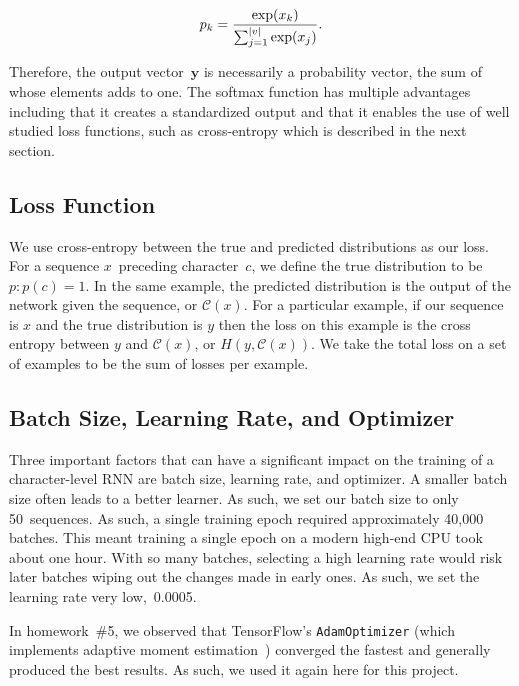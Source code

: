 \documentclass{article}
\DeclarePairedDelimiter\abs{\lvert}{\rvert}%
\begin{document}
\begin{equation}
  p_k = \frac{\exp(x_k)}{\sum_{j=1}^{\abs*{v}} \exp(x_j)}\textrm{.}
\end{equation}

Therefore, the output vector~$\mathbf{y}$ is necessarily a probability vector, the sum of whose elements adds to one. The softmax function has multiple advantages including that it creates a standardized output and that it enables the use of well studied loss functions, such as cross-entropy which is described in the next section.

\subsection{Loss Function}

We use cross-entropy between the true and predicted distributions as our loss. For a sequence $x$~preceding character~$c$, we define the true distribution to be $p: p(c) = 1$. In the same example, the predicted distribution is the output of the network given the sequence, or $\mathcal{C}(x)$. For a particular example, if our sequence is $x$ and the true distribution is $y$ then the loss on this example is the cross entropy between $y$ and $\mathcal{C}(x)$, or $H(y, \mathcal{C}(x))$. We take the total loss on a set of examples to be the sum of losses per example.

\subsection{Batch Size, Learning Rate, and Optimizer}

Three important factors that can have a significant impact on the training of a character-level RNN are batch size, learning rate, and optimizer.  A smaller batch size often leads to a better learner.  As such, we set our batch size to only 50~sequences.  As such, a single training epoch required approximately 40,000 batches. This meant training a single epoch on a modern high-end CPU took about one hour.  With so many batches, selecting a high learning rate would risk later batches wiping out the changes made in early ones.  As such, we set the learning rate very low,~0.0005. 

In homework~\#5, we observed that TensorFlow's \texttt{AdamOptimizer} (which implements adaptive moment estimation~\cite{kingma2014}) converged the fastest and generally produced the best results.  As such, we used it again here for this project.  
\end{document}
